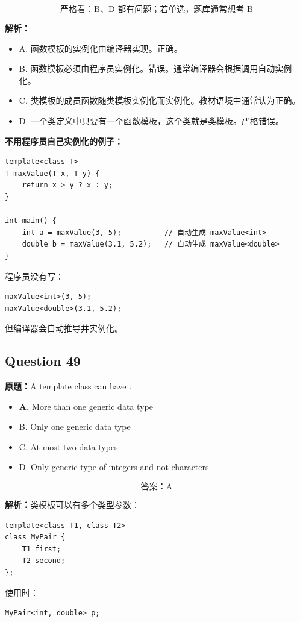 \documentclass[11pt, a4paper]{article}
\begin{document}
\[
\boxed{\text{严格看：B、D 都有问题；若单选，题库通常想考 B}}
\]

\textbf{解析：}
\begin{itemize}
    \item A. 函数模板的实例化由编译器实现。正确。
    \item B. 函数模板必须由程序员实例化。错误。通常编译器会根据调用自动实例化。
    \item C. 类模板的成员函数随类模板实例化而实例化。教材语境中通常认为正确。
    \item D. 一个类定义中只要有一个函数模板，这个类就是类模板。严格错误。
\end{itemize}

\textbf{不用程序员自己实例化的例子：}
\begin{lstlisting}
template<class T>
T maxValue(T x, T y) {
    return x > y ? x : y;
}

int main() {
    int a = maxValue(3, 5);          // 自动生成 maxValue<int>
    double b = maxValue(3.1, 5.2);   // 自动生成 maxValue<double>
}
\end{lstlisting}

程序员没有写：
\begin{lstlisting}
maxValue<int>(3, 5);
maxValue<double>(3.1, 5.2);
\end{lstlisting}
但编译器会自动推导并实例化。


\subsection*{Question 49}
\textbf{原题：}A template class can have \underline{\hspace{2cm}}.
\begin{itemize}
    \item \textbf{A.} More than one generic data type
    \item B. Only one generic data type
    \item C. At most two data types
    \item D. Only generic type of integers and not characters
\end{itemize}

\[
\boxed{\text{答案：A}}
\]

\textbf{解析：}类模板可以有多个类型参数：
\begin{lstlisting}
template<class T1, class T2>
class MyPair {
    T1 first;
    T2 second;
};
\end{lstlisting}
使用时：
\begin{lstlisting}
MyPair<int, double> p;
\end{lstlisting}
\end{document}

